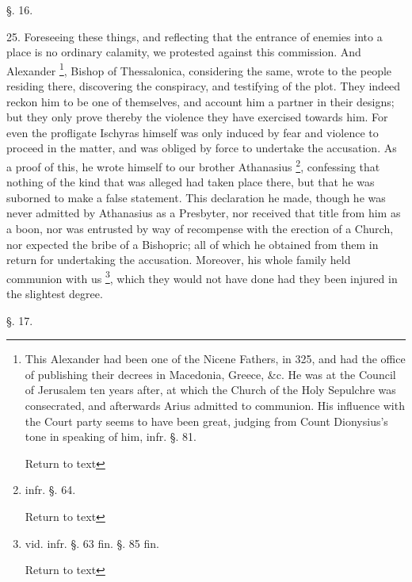 §. 16.

25. Foreseeing these things, and reflecting that
the entrance of enemies into a place is no ordinary calamity, we
protested against this commission. And Alexander \footnote{This Alexander had been one of the Nicene Fathers, in 325, and had the
office of publishing their decrees in Macedonia, Greece, \&c. He
was at the Council of Jerusalem ten years after, at which the Church
of the Holy Sepulchre was consecrated, and afterwards Arius admitted
to communion. His influence with the Court party seems to have been
great, judging from Count Dionysius's tone in speaking of him, infr.
§. 81.

Return to text}, Bishop of Thessalonica, considering the same, wrote to the
people residing there, discovering the conspiracy, and testifying of
the plot. They indeed reckon him to be one of themselves, and account
him a partner in their designs; but they only prove thereby the
violence they have exercised towards him. For even the profligate
Ischyras himself was only induced by fear and violence to proceed in
the matter, and was obliged by force to undertake the accusation. As a
proof of this, he wrote himself to our brother Athanasius \footnote{infr. §. 64.

Return to text}, confessing that nothing of the kind that was alleged had
taken place there, but that he was suborned to make a false
statement. This declaration he made, though he was never admitted by
Athanasius as a Presbyter, nor received that title from him as a boon,
nor was entrusted by way of recompense with the erection of a Church,
nor expected the bribe of a Bishopric; all of which he obtained from
them in return for undertaking the accusation. Moreover, his whole
family held communion with us \footnote{vid. infr. §. 63 fin. §. 85 fin.

Return to text}, which they would not have done had they been injured in the
slightest degree.

§. 17.

